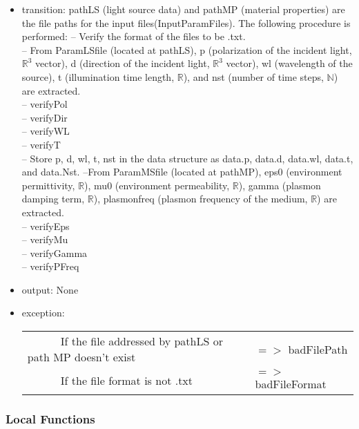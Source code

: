 \documentclass[12pt, titlepage]{article}
\begin{document}
\begin{itemize}
	\item transition: pathLS (light source data) and pathMP (material properties) are the file paths for the input files(InputParamFiles). The following procedure is performed:
	\subitem -- Verify the format of the files to be .txt.\\
	\subitem -- From ParamLSfile (located at pathLS), p (polarization of the incident light, $\mathbb{R}^3$ vector), d (direction of the incident light, $\mathbb{R}^3$ vector), wl (wavelength of the source), t (illumination time length, $\mathbb{R}$), and nst (number of time steps, $\mathbb{N}$) are extracted.\\
	\subitem -- verifyPol\\
	\subitem -- verifyDir\\
	\subitem -- verifyWL\\
	\subitem -- verifyT\\
	\subitem -- Store p, d, wl, t, nst in the data structure as data.p, data.d, data.wl, data.t, and data.Nst.
	\subitem --From ParamMSfile (located at pathMP), eps0 (environment permittivity, $\mathbb{R}$), mu0 (environment permeability, $\mathbb{R}$), gamma (plasmon damping term, $\mathbb{R}$), plasmonfreq (plasmon frequency of the medium, $\mathbb{R}$) are extracted.\\
	\subitem -- verifyEps\\
	\subitem -- verifyMu\\
	\subitem -- verifyGamma\\
	\subitem -- verifyPFreq\\
	\item output: None
	
	\item exception: 
	\noindent \begin{longtable*}[l]{l l}
	\ \ \ \ \ \ If the file addressed by pathLS or path MP doesn't exist & $=>$ badFilePath\\
	\ \ \ \ \ \ If the file format is not .txt & $=>$ badFileFormat\\
	\end{longtable*}

\end{itemize}

\subsubsection{Local Functions}
\end{document}
